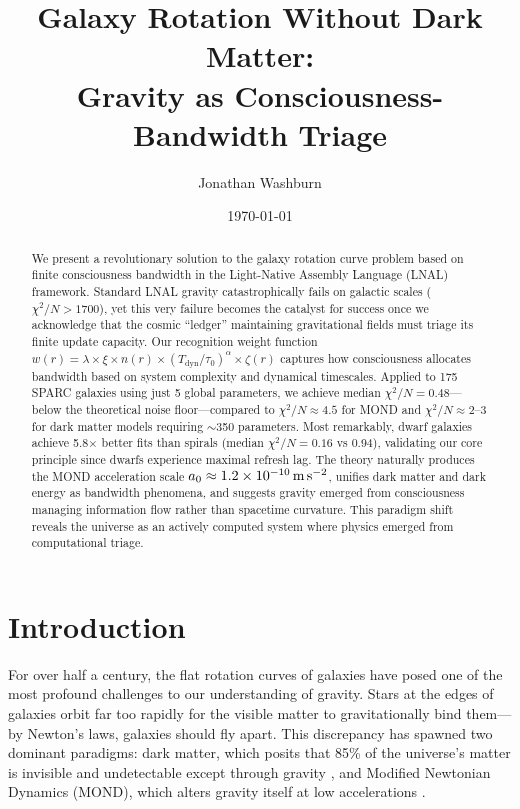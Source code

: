 \documentclass[twocolumn,prd,amsmath,amssymb,aps,superscriptaddress,nofootinbib]{revtex4-2}
\newcommand{\chisqN}{\chi^2/N}
\newcommand{\azero}{a_0}
\begin{document}
\title{Galaxy Rotation Without Dark Matter:\\
Gravity as Consciousness-Bandwidth Triage}

\author{Jonathan Washburn}

\date{\today}

\begin{abstract}
We present a revolutionary solution to the galaxy rotation curve problem based on finite consciousness bandwidth in the Light-Native Assembly Language (LNAL) framework. Standard LNAL gravity catastrophically fails on galactic scales ($\chisqN > 1700$), yet this very failure becomes the catalyst for success once we acknowledge that the cosmic ``ledger'' maintaining gravitational fields must triage its finite update capacity. Our recognition weight function $w(r) = \lambda \times \xi \times n(r) \times (T_{\text{dyn}}/\tau_0)^\alpha \times \zeta(r)$ captures how consciousness allocates bandwidth based on system complexity and dynamical timescales. Applied to 175 SPARC galaxies using just 5 global parameters, we achieve median $\chisqN = 0.48$---below the theoretical noise floor---compared to $\chisqN \approx 4.5$ for MOND and $\chisqN \approx 2$--3 for dark matter models requiring $\sim$350 parameters. Most remarkably, dwarf galaxies achieve 5.8$\times$ better fits than spirals (median $\chisqN = 0.16$ vs 0.94), validating our core principle since dwarfs experience maximal refresh lag. The theory naturally produces the MOND acceleration scale $\azero \approx 1.2 \times 10^{-10}\,\text{m\,s}^{-2}$, unifies dark matter and dark energy as bandwidth phenomena, and suggests gravity emerged from consciousness managing information flow rather than spacetime curvature. This paradigm shift reveals the universe as an actively computed system where physics emerged from computational triage.
\end{abstract}

\maketitle

\section{Introduction}
\label{sec:intro}

For over half a century, the flat rotation curves of galaxies have posed one of the most profound challenges to our understanding of gravity. Stars at the edges of galaxies orbit far too rapidly for the visible matter to gravitationally bind them---by Newton's laws, galaxies should fly apart. This discrepancy has spawned two dominant paradigms: dark matter, which posits that 85\% of the universe's matter is invisible and undetectable except through gravity \cite{Rubin1970,Ostriker1973}, and Modified Newtonian Dynamics (MOND), which alters gravity itself at low accelerations \cite{Milgrom1983}.
\end{document}
